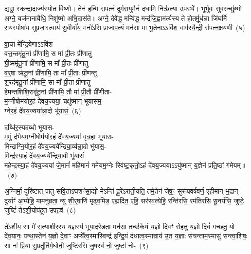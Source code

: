 द्यद्वा॒ स्कन्दा॒दाज्य॑स्यो॒त वि॑ष्णो। तेन॑ हन्मि स॒पत्नं॑ दुर्मरा॒युमैनं॑ दधामि॒ निर्\mbox{}ऋ॑त्या उ॒पस्थे᳚। भूर्भुवः॒ सुव॒रुच्छु॑ष्मो अग्ने॒ यज॑मानायैधि॒ निशु॑ष्मो अभि॒दास॑ते। अग्ने॒ देवे᳚द्ध॒ मन्वि॑द्ध॒ मन्द्र॑जि॒ह्वाम॑र्त्यस्य ते होतर्मू॒र्धन्ना जि॑घर्मि रा॒यस्पोषा॑य सुप्रजा॒स्त्वाय॑ सु॒वीर्या॑य॒ मनो॑\-ऽसि प्राजाप॒त्यं मन॑सा मा भू॒तेना\-ऽऽ\-वि॑श॒ वाग॑स्यै॒न्द्री स॑पत्न॒क्षय॑णी~(५)

वा॒चा मे᳚न्द्रि॒येणा\-ऽऽ\-वि॑श\\
वस॒न्तमृ॑तू॒नां प्री॑णामि॒ स मा᳚ प्री॒तः प्री॑णातु\\
ग्री॒ष्ममृ॑तू॒नां प्री॑णामि॒ स मा᳚ प्री॒तः प्री॑णातु\\
व॒र्॒\mbox{}षा ऋ॑तू॒नां प्री॑णामि॒ ता मा᳚ प्री॒ताः प्री॑णन्तु\\
श॒रद॑मृतू॒नां प्री॑णामि॒ सा मा᳚ प्री॒ता प्री॑णातु\\
हेमन्तशिशि॒रावृ॑तू॒नां प्री॑णामि॒ तौ मा᳚ प्री॒तौ प्री॑णीता-\\
म॒ग्नी\-षोम॑योर॒हं दे॑वय॒ज्यया॒ चक्षु॑ष्मान् भूयासम॒-\\
ग्नेर॒हं दे॑वय॒ज्यया᳚न्ना॒दो भू॑यासं॒~(६)

दब्धि॑र॒स्यद॑ब्धो भूयास-\\
म॒मुं द॑भेयम॒ग्नी\-षोम॑योर॒हं दे॑वय॒ज्यया॑ वृत्र॒हा भू॑यास-\\
मिन्द्राग्नि॒योर॒हं दे॑वय॒ज्यये᳚न्द्रिया॒\-व्य॑न्ना॒दो भू॑यास॒-\\
मिन्द्र॑स्या॒हं दे॑वय॒ज्यये᳚न्द्रिया॒वी भू॑यासं\\
महे॒न्द्रस्या॒हं दे॑वय॒ज्यया॑ जे॒मानं॑ महि॒मानं॑ गमेयम॒ग्नेः स्वि॑ष्ट॒कृतो॒\-ऽहं दे॑वय॒ज्यया\-ऽऽ\-यु॑ष्मान् य॒ज्ञेन॑ प्रति॒ष्ठां ग॑मेयम्॥~(७)

{\anuvakamend[{रिष्या᳚थ्सपत्न॒क्षय॑ण्यन्ना॒दो भू॑यास॒ꣳ॒ षट्त्रिꣳ॑शच्च}]}%

अ॒ग्निर्मा॒ दुरि॑ष्टात् पातु सवि॒ता\-ऽघशꣳ॑सा॒द्यो मे\-ऽन्ति॑ दू॒रे॑\-ऽराती॒यति॒ तमे॒तेन॑ जेष॒ꣳ॒ सुरू॑पवर्\mbox{}षवर्ण॒ एही॒मान् भ॒द्रान् दुर्याꣳ॑ अ॒भ्येहि॒ मामनु॑व्रता॒ न्यु॑ शी॒र्॒\mbox{}षाणि॑ मृढ्व॒मिड॒ एह्यदि॑त॒ एहि॒ सर॑स्व॒त्येहि॒ रन्ति॑रसि॒ रम॑तिरसि सू॒नर्य॑सि॒ जुष्टे॒ जुष्टिं॑ ते\-ऽशी॒योप॑हूत उपह॒वं~(८)

ते॑\-ऽशीय॒ सा मे॑ स॒त्याशीर॒स्य य॒ज्ञस्य॑ भूया॒दरे॑डता॒ मन॑सा॒ तच्छ॑केयं य॒ज्ञो दिवꣳ॑ रोहतु य॒ज्ञो दिवं॑ गच्छतु॒ यो दे॑व॒यानः॒ पन्था॒स्तेन॑ य॒ज्ञो दे॒वाꣳ अप्ये᳚त्व॒स्मास्विन्द्र॑ इन्द्रि॒यं द॑धात्व॒स्मान्राय॑ उ॒त य॒ज्ञाः स॑चन्ताम॒स्मासु॑ सन्त्वा॒शिषः॒ सा नः॑ प्रि॒या सु॒प्रतू᳚र्तिर्म॒घोनी॒ जुष्टि॑रसि जु॒षस्व॑ नो॒ जुष्टा॑ नो-~(९)

